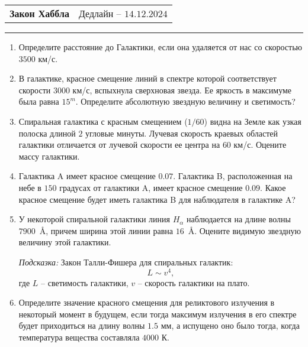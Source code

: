 \documentclass[12pt]{article}
\begin{document}
    \begin{tabularx}{\textwidth}{Xr}
    {\Large \textbf{Закон Хаббла}} & Дедлайн -- $14.12.2024$ \\
    \end{tabularx}
    \noindent\rule{\textwidth}{0.4pt}
    \begin{enumerate}
        \item Определите расстояние до Галактики, если она удаляется от нас со скоростью $3500$ км/с.
        \item В галактике, красное смещение линий в спектре которой соответствует скорости $3000$ км/с, вспыхнула сверхновая звезда. Ее яркость в максимуме была равна $15^m$. Определите абсолютную звездную величину и светимость?
        \item Спиральная галактика с красным смещением ($1/60$) видна на Земле как узкая полоска длиной $2$ угловые минуты. Лучевая скорость краевых областей галактики отличается от лучевой скорости ее центра на $60$ км/с. Оцените массу галактики.
        \item Галактика A имеет красное смещение $0.07$. Галактика B, расположенная на небе в $150$ градусах от галактики A, имеет красное смещение $0.09$. Какое красное смещение будет иметь галактика B для наблюдателя в галактике A? 
        \item У некоторой спиральной галактики линия $H_{\alpha}$ наблюдается на длине волны $7900$~\AA, причем ширина этой линии равна $16$~\AA. Оцените видимую звездную величину этой галактики.
        
        \textit{Подсказка:} Закон Талли-Фишера для спиральных галактик:
        $$
        L\sim v^4,
        $$
        где $L$ -- светимость галактики, $v$ -- скорость галактики на плато.
        \item Определите значение красного смещения для реликтового излучения в некоторый момент в будущем, если тогда максимум излучения в его спектре будет приходиться на длину волны $1.5$ мм, а испущено оно было тогда, когда температура вещества составляла $4000$ К.
    \end{enumerate}
\end{document}
